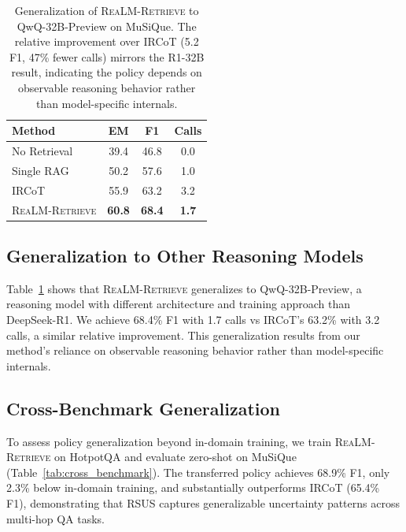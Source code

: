 \documentclass[sigconf,natbib=true]{acmart}
\newcommand{\methodname}{\textsc{ReaLM-Retrieve}}
\begin{document}
\begin{table}[t]
\small
\centering
\caption{Generalization of \methodname{} to QwQ-32B-Preview on MuSiQue. The relative improvement over IRCoT (5.2 F1, 47\% fewer calls) mirrors the R1-32B result, indicating the policy depends on observable reasoning behavior rather than model-specific internals.}
\label{tab:qwq_generalization}
\begin{tabular}{@{}l|ccc@{}}
\toprule
\textbf{Method} & \textbf{EM} & \textbf{F1} & \textbf{Calls} \\
\midrule
No Retrieval & 39.4 & 46.8 & 0.0 \\
Single RAG & 50.2 & 57.6 & 1.0 \\
IRCoT & 55.9 & 63.2 & 3.2 \\
\methodname{} & \textbf{60.8} & \textbf{68.4} & \textbf{1.7} \\
\bottomrule
\end{tabular}
\end{table}

\subsection{Generalization to Other Reasoning Models}
Table~\ref{tab:qwq_generalization} shows that \methodname{} generalizes to QwQ-32B-Preview, a reasoning model with different architecture and training approach than DeepSeek-R1. We achieve 68.4\% F1 with 1.7 calls vs IRCoT's 63.2\% with 3.2 calls, a similar relative improvement. This generalization results from our method's reliance on observable reasoning behavior rather than model-specific internals.

\subsection{Cross-Benchmark Generalization}
To assess policy generalization beyond in-domain training, we train \methodname{} on HotpotQA and evaluate zero-shot on MuSiQue (Table~\ref{tab:cross_benchmark}). The transferred policy achieves 68.9\% F1, only 2.3\% below in-domain training, and substantially outperforms IRCoT (65.4\% F1), demonstrating that RSUS captures generalizable uncertainty patterns across multi-hop QA tasks.
\end{document}
